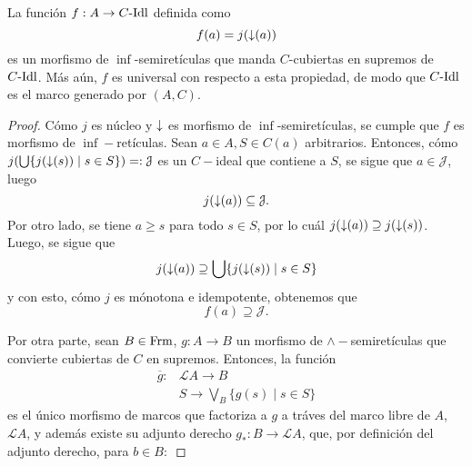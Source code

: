 
\begin{lemma}
    La función $f:A\to C\text{-}\mathrm{Idl}$ definida como
    \begin{equation*}
        f(a)=j({\downarrow}(a))
    \end{equation*}
    es un morfismo de $\inf$-semiretículas que
    manda $C$-cubiertas en supremos de $C\text{-}\mathrm{Idl}$.
    Más aún, $f$ es universal con respecto a esta propiedad,
    de modo que $C\text{-}\mathrm{Idl}$ es el marco generado por $(A,C)$.
\end{lemma}

\begin{proof}
    Cómo $j$ es núcleo y ${\downarrow}$ es morfismo
    de $\inf$-semiretículas,
    se cumple que $f$ es morfismo de $\inf-$retículas.
    Sean $a\in A,S\in C(a)$ arbitrarios. Entonces, cómo $j(\bigcup\{j({\downarrow}(s))\mid s\in S\})=:\mathcal{J}$ es un $C-$ideal que contiene a $S$, se sigue que $a\in\mathcal{J}$, luego 
    \begin{equation*}
        j({\downarrow}(a))\subseteq \mathcal{J}.
    \end{equation*}
    Por otro lado, se tiene $a\geq s$ para todo $s\in S$, por lo cuál $j({\downarrow}(a))\supseteq j({\downarrow}(s))$. Luego, se sigue que
    \begin{equation*}
        j({\downarrow}(a))\supseteq \bigcup\{j({\downarrow}(s))\mid s\in S\}
    \end{equation*}
    y con esto, cómo $j$ es mónotona e idempotente, obtenemos que
    \begin{equation*}
        f(a)\supseteq\mathcal{J}.
    \end{equation*}

    Por otra parte, sean $B\in\mathrm{Frm}$, $g:A\to B$ un morfismo de $\wedge-$semiretículas que convierte cubiertas de $C$ en supremos. Entonces, la función 
    \begin{align*}
        \overline{g}: &\mathcal{L}A\to B \\
                      & S\to \bigvee_B\{g(s)\mid s\in S\}
    \end{align*}
    es el único morfismo de marcos que factoriza a $g$ a tráves del marco libre de $A$, $\mathcal{L}A$, y además existe su adjunto derecho $g_*:B\to\mathcal{L}A$, que, por definición del adjunto derecho, para $b\in B:$


\end{proof}
